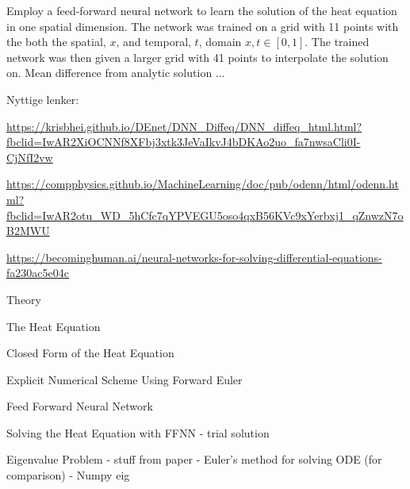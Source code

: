 Employ a feed-forward neural network to learn the solution of the heat equation in one spatial dimension. The network was trained on a grid with 11 points with the both the spatial, $x$, and temporal, $t$, domain $x, t \in [0,1]$. The trained network was then given a larger grid with 41 points to interpolate the solution on. Mean difference from analytic solution ...



Nyttige lenker:

\url{https://krisbhei.github.io/DEnet/DNN_Diffeq/DNN_diffeq_html.html?fbclid=IwAR2XiOCNNf8XFbj3xtk3JeVaIkvJ4bDKAo2uo_fa7nwsaCli0I-CjNfI2vw}

\url{https://compphysics.github.io/MachineLearning/doc/pub/odenn/html/odenn.html?fbclid=IwAR2otu_WD_5hCfc7qYPVEGU5oso4qxB56KVc9xYerbxj1_qZnwzN7oB2MWU}

\url{https://becominghuman.ai/neural-networks-for-solving-differential-equations-fa230ac5e04c} 

Theory

The Heat Equation 

Closed Form of the Heat Equation

Explicit Numerical Scheme Using Forward Euler

Feed Forward Neural Network

Solving the Heat Equation with FFNN 
- trial solution

Eigenvalue Problem
- stuff from paper
- Euler's method for solving ODE (for comparison)
- Numpy eig
